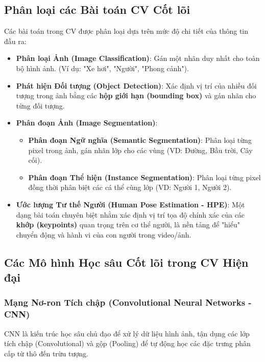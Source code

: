 \subsection{Phân loại các Bài toán CV Cốt lõi}
Các bài toán trong CV được phân loại dựa trên mức độ chi tiết của thông tin đầu ra:

\begin{itemize}
    \item \textbf{Phân loại Ảnh (Image Classification)}: Gán một nhãn duy nhất cho toàn bộ hình ảnh. (Ví dụ: "Xe hơi", "Người", "Phong cảnh").
    \item \textbf{Phát hiện Đối tượng (Object Detection)}: Xác định vị trí của nhiều đối tượng trong ảnh bằng các \textbf{hộp giới hạn (bounding box)} và gán nhãn cho từng đối tượng.
    \item \textbf{Phân đoạn Ảnh (Image Segmentation)}:
    \begin{itemize}
        \item \textbf{Phân đoạn Ngữ nghĩa (Semantic Segmentation)}: Phân loại từng pixel trong ảnh, gán nhãn lớp cho các vùng (VD: Đường, Bầu trời, Cây cối).
        \item \textbf{Phân đoạn Thể hiện (Instance Segmentation)}: Phân loại từng pixel đồng thời phân biệt các cá thể cùng lớp (VD: Người 1, Người 2).
    \end{itemize}
    \item \textbf{Ước lượng Tư thế Người (Human Pose Estimation - HPE)}: Một dạng bài toán chuyên biệt nhằm xác định vị trí tọa độ chính xác của các \textbf{khớp (keypoints)} quan trọng trên cơ thể người, là nền tảng để "hiểu" chuyển động và hành vi của con người trong video/ảnh.
\end{itemize}

\subsection{Các Mô hình Học sâu Cốt lõi trong CV Hiện đại}
\subsubsection{Mạng Nơ-ron Tích chập (Convolutional Neural Networks - CNN)}
CNN là kiến trúc học sâu chủ đạo để xử lý dữ liệu hình ảnh, tận dụng các lớp tích chập (Convolutional) và gộp (Pooling) để tự động học các đặc trưng phân cấp từ thô đến trừu tượng.

